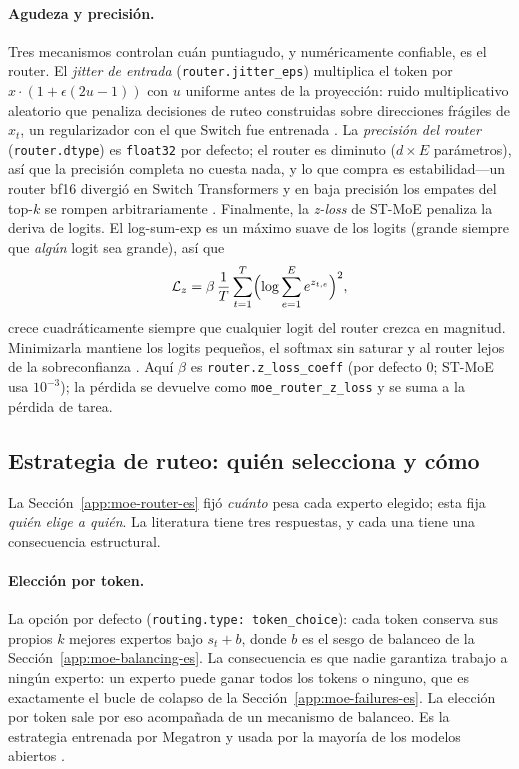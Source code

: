 \paragraph{Agudeza y precisión.}
Tres mecanismos controlan cuán puntiagudo, y numéricamente confiable, es el
router. El \emph{jitter de entrada} (\texttt{router.jitter\_eps}) multiplica
el token por $x \cdot (1 + \epsilon(2u-1))$ con $u$ uniforme antes de la
proyección: ruido multiplicativo aleatorio que penaliza decisiones de ruteo
construidas sobre direcciones frágiles de $x_t$, un regularizador con el que
Switch fue entrenada \citep{fedus2021switch}. La \emph{precisión del router}
(\texttt{router.dtype}) es \texttt{float32} por defecto; el router es diminuto
($d \times E$ parámetros), así que la precisión completa no cuesta nada, y lo
que compra es estabilidad---un router bf16 divergió en Switch Transformers y
en baja precisión los empates del top-$k$ se rompen arbitrariamente
\citep{fedus2021switch}. Finalmente, la \emph{z-loss} de ST-MoE penaliza la
deriva de logits. El log-sum-exp es un máximo suave de los logits (grande
siempre que \emph{algún} logit sea grande), así que
\begin{equation}
  \mathcal{L}_z = \beta\,\frac{1}{T}\sum_{t=1}^{T}
  \Bigl(\log \sum_{e=1}^{E} e^{z_{t,e}}\Bigr)^{2},
  \label{eq:zloss-es}
\end{equation}
crece cuadráticamente siempre que cualquier logit del router crezca en
magnitud. Minimizarla mantiene los logits pequeños, el softmax sin saturar y
al router lejos de la sobreconfianza \citep{zoph2022stmoe}. Aquí $\beta$ es
\texttt{router.z\_loss\_coeff} (por defecto $0$; ST-MoE usa $10^{-3}$); la
pérdida se devuelve como \texttt{moe\_router\_z\_loss} y se suma a la pérdida
de tarea.

\subsection{Estrategia de ruteo: quién selecciona y cómo}
\label{app:moe-routing-es}

La Sección~\ref{app:moe-router-es} fijó \emph{cuánto} pesa cada experto
elegido; esta fija \emph{quién elige a quién}. La literatura tiene tres
respuestas, y cada una tiene una consecuencia estructural.

\paragraph{Elección por token.}
La opción por defecto (\texttt{routing.type: token\_choice}): cada token
conserva sus propios $k$ mejores expertos bajo $s_t + b$, donde $b$ es el sesgo
de balanceo de la Sección~\ref{app:moe-balancing-es}. La consecuencia es que
nadie garantiza trabajo a ningún experto: un experto puede ganar todos los
tokens o ninguno, que es exactamente el bucle de colapso de la
Sección~\ref{app:moe-failures-es}. La elección por token sale por eso
acompañada de un mecanismo de balanceo. Es la estrategia entrenada por
Megatron y usada por la mayoría de los modelos abiertos
\citep{fedus2021switch,deepseek2024v3}.

